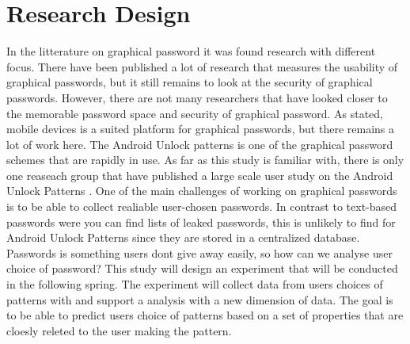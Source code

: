 \chapter{Research Design}
  
  In the litterature on graphical password it was found research with different focus. There have been published a lot of research that measures the usability of graphical passwords, but it still remains to look at the security of graphical passwords. However, there are not many researchers that have looked closer to the memorable password space and security of graphical password. As stated, mobile devices is a suited platform for graphical passwords, but there remains a lot of work here. The Android Unlock patterns is one of the graphical password schemes that are rapidly in use. As far as this study is familiar with, there is only one reaseach group that have published a large scale user study on the Android Unlock Patterns \cite{Ullenbeck}. One of the main challenges of working on graphical passwords is to be able to collect realiable user-chosen passwords. In contrast to text-based passwords were you can find lists of leaked passwords, this is unlikely to find for Android Unlock Patterns since they are stored in a centralized database. Passwords is something users dont give away easily, so how can we analyse user choice of password?  This study will design an experiment that will be conducted in the following spring. The experiment will collect data from users choices of patterns with and support a analysis with a new dimension of data. The goal is to be able to predict users choice of patterns based on a set of properties that are cloesly releted to the user making the pattern. 

 

  

      


